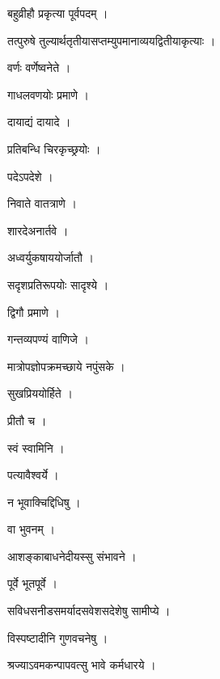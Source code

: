 \documentclass[10pt, openany]{book}
\begin{document}
\noindent बहुव्रीहौ प्रकृत्या पूर्वपदम् ।

\noindent तत्पुरुषे तुल्यार्थतृतीयासप्तम्युपमानाव्ययद्वितीयाकृत्याः ।

\noindent वर्णः वर्णेष्वनेते ।

\noindent गाधलवणयोः प्रमाणे ।

\noindent दायाद्यं दायादे ।

\noindent प्रतिबन्धि चिरकृच्छ्रयोः ।

\noindent पदेऽपदेशे ।

\noindent निवाते वातत्राणे ।

\noindent शारदेअनार्तवे ।

\noindent अध्वर्युकषाययोर्जातौ ।

\noindent सदृशप्रतिरूपयोः सादृश्ये ।

\noindent द्विगौ प्रमाणे ।

\noindent गन्तव्यपण्यं वाणिजे ।

\noindent मात्रोपज्ञोपक्रमच्छाये नपुंसके ।

\noindent सुखप्रिययोर्हिते ।

\noindent प्रीतौ च ।

\noindent स्वं स्वामिनि ।

\noindent पत्यावैश्वर्ये ।

\noindent न भूवाक्चिद्दिधिषु ।

\noindent वा भुवनम् ।

\noindent आशङ्काबाधनेदीयस्सु संभावने ।

\noindent पूर्वे भूतपूर्वे ।

\noindent सविधसनीडसमर्यादसवेशसदेशेषु सामीप्ये ।

\noindent विस्पष्टादीनि गुणवचनेषु ।

\noindent श्रज्याऽवमकन्पापवत्सु भावे कर्मधारये ।
\end{document}

